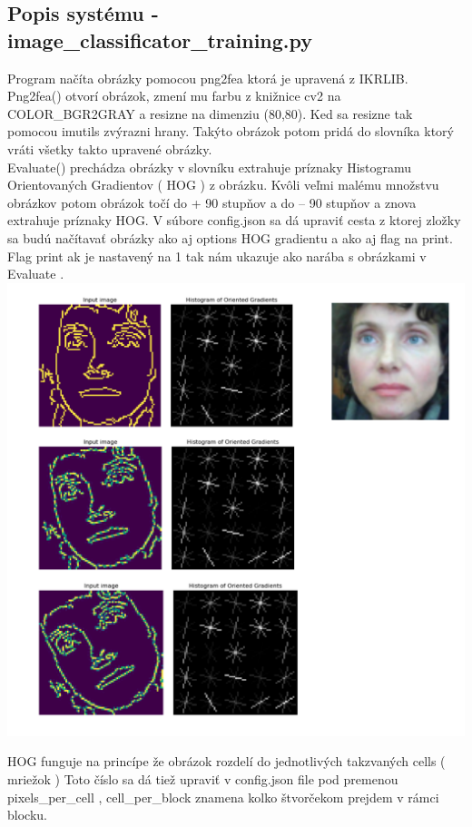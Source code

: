 \documentclass{article}
\begin{document}
    \subsection{Popis systému - image\_classificator\_training.py}
    \Large{Program načíta obrázky pomocou png2fea ktorá je upravená z IKRLIB.\\
Png2fea() otvorí obrázok, zmení mu farbu z knižnice cv2 na COLOR\_BGR2GRAY a resizne na dimenziu (80,80). Ked sa resizne tak pomocou imutils zvýrazni hrany. Takýto obrázok potom pridá do slovníka ktorý vráti všetky takto upravené obrázky. \\
    Evaluate()  prechádza obrázky v slovníku   extrahuje príznaky Histogramu Orientovaných Gradientov ( HOG ) z obrázku. Kvôli veľmi malému množstvu obrázkov potom obrázok  točí do + 90 stupňov a do – 90 stupňov a znova extrahuje príznaky  HOG.  V súbore config.json sa dá upraviť cesta z ktorej zložky sa budú načítavať obrázky ako aj options HOG gradientu a ako aj flag na print. Flag print ak je nastavený na 1 tak nám ukazuje ako narába s obrázkami v Evaluate .
}
    \center\includegraphics[width=0.85\linewidth]{./image4.png}\\
    \newpage
    \begin{flushleft}
    \Large{HOG funguje na princípe že obrázok  rozdelí do jednotlivých takzvaných cells ( mriežok )  Toto číslo sa dá tiež upraviť v config.json file pod premenou  pixels_per_cell , cell\_per\_block znamena kolko štvorčekom prejdem v rámci blocku.}
    \end{flushleft}
\end{document}
